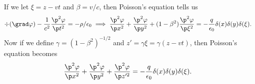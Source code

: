 If we let $\xi=z-vt$ and $\beta =v/c$, then Poisson's equation tells us
\begin{equation}
    \div (\grad \varphi)-\frac{1}{c^2}\frac{\p^2 \varphi}{\p t^2} = -\rho/\epsilon_0 \implies \frac{\p^2 \varphi}{\p x^2} + \frac{\p^2 \varphi}{\p y^2} +(1-\beta^2) \frac{\p^2 \varphi}{\p \xi^2} = -\frac{q}{\epsilon_0}\delta(x)\delta(y)\delta(\xi).
\end{equation}
Now if we define $\gamma = (1-\beta^2)^{-1/2}$ and $z'= \gamma \xi = \gamma(z-vt)$, then Poisson's equation becomes
\begin{equation}
    \frac{\p^2 \varphi}{\p x^2} + \frac{\p^2 \varphi}{\p y^2} +\frac{\p^2 \varphi}{\p z'^2} = -\frac{q}{\epsilon_0}\delta(x)\delta(y)\delta(\xi).
\end{equation}
